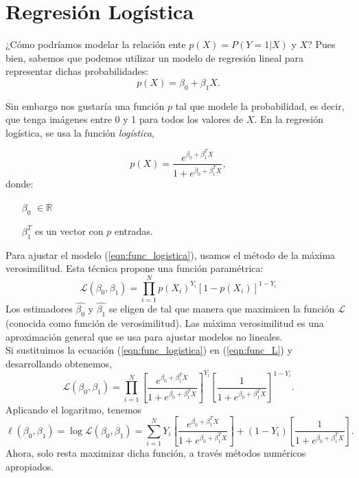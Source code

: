 \documentclass[11pt,letterpaper, reqno]{article}
\begin{document}
\section{Regresión Logística}

¿Cómo podríamos modelar la relación ente $p(X) = P(Y=1|X)$ y $X$? Pues bien, sabemos que podemos utilizar un modelo de regresión lineal para representar dichas probabilidades:
\begin{equation*}
p(X) = \beta_0 + \beta_1X.
\end{equation*}

Sin embargo nos gustaría una función $p$ tal que modele la probabilidad, es decir, que tenga imágenes entre 0 y 1 para todos los valores de $X$. En la regresión logística, se usa la función \textit{logística},

\begin{equation}
	\label{eqn:func_logistica}
	p(X) = \frac{e^{\beta_0 + \beta_1^{T} X}}{1+e^{\beta_0 + \beta_1^{T}X}},
\end{equation}
donde:
\begin{itemize}
	\item[$\beta_0$]$\in \mathbb{R}$
	\item[$\beta_1^T$] es un vector con $p$ entradas.
\end{itemize}
Para ajustar el modelo (\ref{eqn:func_logistica}), usamos el método de la máxima verosimilitud. Esta técnica propone una función paramétrica:
\begin{equation}
	\label{eqn:func_L}
	\mathcal{L}(\beta_{0}, \beta_{1}) = \prod_{i=1}^{N}p(X_i)^{Y_i}[1-p(X_{i})]^{1-Y_i}
\end{equation}
Los estimadores $\hat{\beta_0}$ y $\hat{\beta_1}$ se eligen de tal que manera que maximicen la función $\mathcal{L}$ (conocida como función de verosimilitud). Las máxima verosimilitud es una aproximación general que se usa para ajustar modelos no lineales.\\

Si sustituimos la ecuación (\ref{eqn:func_logistica}) en (\ref{eqn:func_L}) y desarrollando obtenemos,
$$
\mathcal{L}(\beta_{0}, \beta_{1}) =  \prod_{i=1}^{N} \left[ \frac{e^{\beta_0 + \beta_1^{T} X}}{1+e^{\beta_0 + \beta_1^{T}X}} \right]^{Y_i} \left[\frac{1}{1+e^{\beta_0 + \beta_1^{T}X}} \right]^{1-Y_i}.
$$
Aplicando el logaritmo, tenemos
$$
\ell(\beta_{0}, \beta_{1}) = \log\mathcal{L}(\beta_{0}, \beta_{1}) = \sum_{i=1}^{N} Y_i\left[ \frac{e^{\beta_0 + \beta_1^{T} X}}{1+e^{\beta_0 + \beta_1^{T}X}} \right] +  (1-Y_i)\left[\frac{1}{1+e^{\beta_0 + \beta_1^{T}X}} \right].
$$
Ahora, solo resta maximizar dicha función, a través métodos numéricos apropiados.
\end{document}

